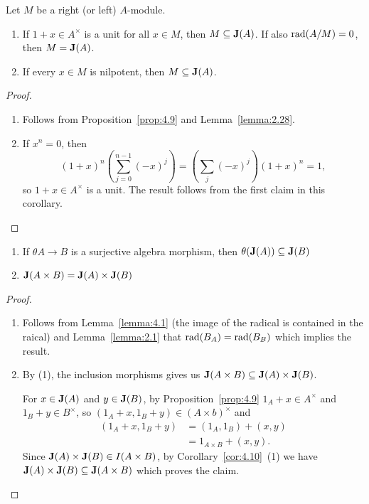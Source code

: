\begin{corollary}\label{cor:4.10}
Let $M$ be a right (or left) $A$-module.
\begin{enumerate}
\item If $1+x\in A^{\times}$ is a unit for all $x\in M$, then $M\subseteq\operatorname{\textup{\textbf{J}}}(A)$.
If also $\operatorname{rad}(A/M)=0$, then $M=\operatorname{\textup{\textbf{J}}}(A)$.
\item If every $x\in M$ is nilpotent, then $M\subseteq\operatorname{\textup{\textbf{J}}}(A)$.
\end{enumerate}
\end{corollary}

\begin{proof}
\begin{enumerate}
\item Follows from Proposition~\ref{prop:4.9} and Lemma~\ref{lemma:2.28}.
\item If $x^{n}=0$, then
\begin{equation}
(1+x)^{n}\left(\sum^{n-1}_{j=0}(-x)^{j}\right)=\left(\sum_{j}(-x)^{j}\right)(1+x)^{n}=1,
\end{equation}
so $1+x\in A^{\times}$ is a unit. The result follows from the first
claim in this corollary.\qedhere
\end{enumerate}
\end{proof}

\begin{lemma}\label{lemma:4.11}
\begin{enumerate}
\item If $\theta A\to B$ is a surjective algebra morphism, then $\theta(\operatorname{\textup{\textbf{J}}}(A))\subseteq\operatorname{\textup{\textbf{J}}}(B)$
\item $\operatorname{\textup{\textbf{J}}}(A\times B)=\operatorname{\textup{\textbf{J}}}(A)\times\operatorname{\textup{\textbf{J}}}(B)$
\end{enumerate}
\end{lemma}

\begin{proof}
\begin{enumerate}
\item Follows from Lemma~\ref{lemma:4.1} (the image of the radical is
  contained in the raical) and Lemma~\ref{lemma:2.1} that
  $\operatorname{rad}(B_{A})=\operatorname{rad}(B_{B})$ which implies the result.
\item By (1), the inclusion morphisms gives us $\operatorname{\textup{\textbf{J}}}(A\times B)\subseteq\operatorname{\textup{\textbf{J}}}(A)\times\operatorname{\textup{\textbf{J}}}(B)$.


For $x\in\operatorname{\textup{\textbf{J}}}(A)$ and $y\in\operatorname{\textup{\textbf{J}}}(B)$, by
Proposition~\ref{prop:4.9} $1_{A}+x\in A^{\times}$ and $1_{B}+y\in B^{\times}$,
so $(1_{A}+x,1_{B}+y)\in(A\times b)^{\times}$ and
\begin{subequations}
  \begin{align}
(1_{A}+x,1_{B}+y) &= (1_{A},1_{B})+(x,y)\\
&=1_{A\times B}+(x,y).
  \end{align}
\end{subequations}
Since $\operatorname{\textup{\textbf{J}}}(A)\times\operatorname{\textup{\textbf{J}}}(B)\in I(A\times B)$, by
Corollary~\ref{cor:4.10}~(1) we have
$\operatorname{\textup{\textbf{J}}}(A)\times\operatorname{\textup{\textbf{J}}}(B)\subseteq\operatorname{\textup{\textbf{J}}}(A\times B)$ which
proves the claim.\qedhere
\end{enumerate}
\end{proof}

